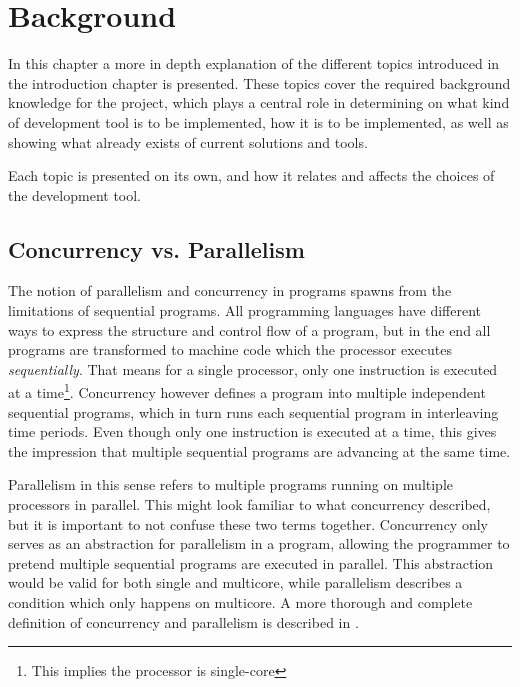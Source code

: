 
\chapter{Background}
\label{ch:background}

In this chapter a more in depth explanation of the different topics introduced in the introduction chapter is presented. These topics cover the required background knowledge for the project, which plays a central role in determining on what kind of development tool is to be implemented, how it is to be implemented, as well as showing what already exists of current solutions and tools.

Each topic is presented on its own, and how it relates and affects the choices of the development tool.


\section{Concurrency vs. Parallelism}
\label{sec:concurrencyvsparallelism}

The notion of parallelism and concurrency in programs spawns from the limitations of sequential programs. All programming languages have different ways to express the structure and control flow of a program, but in the end all programs are transformed to machine code which the processor executes \textit{sequentially}. That means for a single processor, only one instruction is executed at a time\footnote{This implies the processor is single-core}. Concurrency however defines a program into multiple independent sequential programs, which in turn runs each sequential program in interleaving time periods. Even though only one instruction is executed at a time, this gives the impression that multiple sequential programs are advancing at the same time.

Parallelism in this sense refers to multiple programs running on multiple processors in parallel. This might look familiar to what concurrency described, but it is important to not confuse these two terms together. Concurrency only serves as an abstraction for parallelism in a program, allowing the programmer to pretend multiple sequential programs are executed in parallel. This abstraction would be valid for both single and multicore, while parallelism describes a condition which only happens on multicore. A more thorough and complete definition of concurrency and parallelism is described in \citet{benari2006}.

